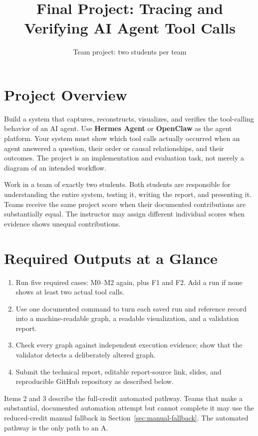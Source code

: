 \documentclass[11pt]{article}
\title{Final Project: Tracing and Verifying AI Agent Tool Calls}
\author{Team project: two students per team}
\date{}
\begin{document}
\maketitle

\section{Project Overview}
Build a system that captures, reconstructs, visualizes, and verifies the tool-calling behavior of an AI agent. Use \textbf{Hermes Agent} or \textbf{OpenClaw} as the agent platform. Your system must show which tool calls actually occurred when an agent answered a question, their order or causal relationships, and their outcomes. The project is an implementation and evaluation task, not merely a diagram of an intended workflow.

Work in a team of exactly two students. Both students are responsible for understanding the entire system, testing it, writing the report, and presenting it. Teams receive the same project score when their documented contributions are substantially equal. The instructor may assign different individual scores when evidence shows unequal contributions.

\section{Required Outputs at a Glance}
\begin{enumerate}
  \item Run five required cases: M0--M2 again, plus F1 and F2. Add a run if none shows at least two actual tool calls.
  \item Use one documented command to turn each saved run and reference record into a machine-readable graph, a readable visualization, and a validation report.
  \item Check every graph against independent execution evidence; show that the validator detects a deliberately altered graph.
  \item Submit the technical report, editable report-source link, slides, and reproducible GitHub repository as described below.
\end{enumerate}
Items 2 and 3 describe the full-credit automated pathway. Teams that make a substantial, documented automation attempt but cannot complete it may use the reduced-credit manual fallback in Section~\ref{sec:manual-fallback}. The automated pathway is the only path to an A.
\end{document}
